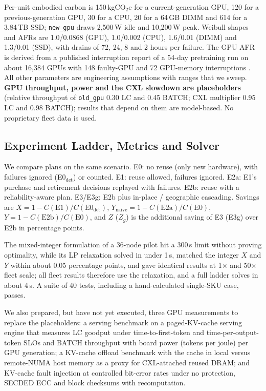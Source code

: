 \documentclass[11pt]{article}
\begin{document}
Per-unit embodied carbon is 150\,kgCO$_2$e for a current-generation GPU, 120 for a previous-generation GPU, 30 for a CPU, 20 for a 64\,GB DIMM and 614 for a 3.84\,TB SSD; \texttt{new\_gpu} draws 2{,}500\,W idle and 10{,}200\,W peak. Weibull shapes and AFRs are 1.0/0.0868 (GPU), 1.0/0.002 (CPU), 1.6/0.01 (DIMM) and 1.3/0.01 (SSD), with drains of 72, 24, 8 and 2 hours per failure. The GPU AFR is derived from a published interruption report of a 54-day pretraining run on about 16{,}384 GPUs with 148 faulty-GPU and 72 GPU-memory interruptions \citep{llama3}. All other parameters are engineering assumptions with ranges that we sweep. \textbf{GPU throughput, power and the CXL slowdown are placeholders} (relative throughput of \texttt{old\_gpu} 0.30 LC and 0.45 BATCH; CXL multiplier 0.95 LC and 0.98 BATCH); results that depend on them are model-based. No proprietary fleet data is used.

\subsection{Experiment Ladder, Metrics and Solver}
We compare plans on the same scenario. E0: no reuse (only new hardware), with failures ignored (E0$_\text{det}$) or counted. E1: reuse allowed, failures ignored. E2a: E1's purchase and retirement decisions replayed with failures. E2b: reuse with a reliability-aware plan. E3/E3g: E2b plus in-place / geographic cascading. Savings are $X=1-C(\text{E1})/C(\text{E0}_\text{det})$, $Y_\text{naive}=1-C(\text{E2a})/C(\text{E0})$, $Y=1-C(\text{E2b})/C(\text{E0})$, and $Z$ ($Z_g$) is the additional saving of E3 (E3g) over E2b in percentage points.

The mixed-integer formulation of a 36-node pilot hit a 300\,s limit without proving optimality, while its LP relaxation solved in under 1\,s, matched the integer $X$ and $Y$ within about 0.05 percentage points, and gave identical results at 1$\times$ and 50$\times$ fleet scale; all fleet results therefore use the relaxation, and a full ladder solves in about 4\,s. A suite of 40 tests, including a hand-calculated single-SKU case, passes.

We also prepared, but have not yet executed, three GPU measurements to replace the placeholders: a serving benchmark on a paged-KV-cache serving engine \citep{kwon2023vllm} that measures LC goodput under time-to-first-token and time-per-output-token SLOs and BATCH throughput with board power (tokens per joule) per GPU generation; a KV-cache offload benchmark with the cache in local versus remote-NUMA host memory as a proxy for CXL-attached reused DRAM; and KV-cache fault injection at controlled bit-error rates under no protection, SECDED ECC and block checksums with recomputation.
\end{document}

